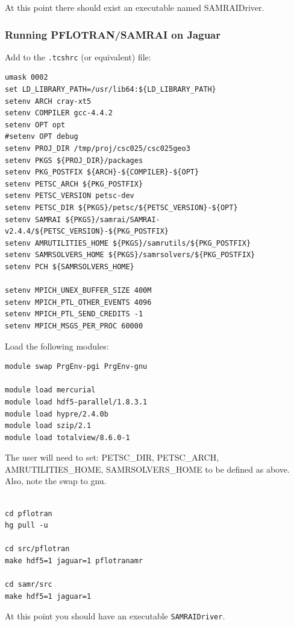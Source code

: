 \documentclass[12pt]{article}
\begin{document}
\noindent
At this point there should exist an executable named SAMRAIDriver.

\subsubsection{Running PFLOTRAN/SAMRAI on Jaguar}

Add to the {\tt .tcshrc} (or equivalent) file:
\begin{verbatim}
umask 0002
set LD_LIBRARY_PATH=/usr/lib64:${LD_LIBRARY_PATH}
setenv ARCH cray-xt5
setenv COMPILER gcc-4.4.2
setenv OPT opt
#setenv OPT debug 
setenv PROJ_DIR /tmp/proj/csc025/csc025geo3
setenv PKGS ${PROJ_DIR}/packages
setenv PKG_POSTFIX ${ARCH}-${COMPILER}-${OPT}
setenv PETSC_ARCH ${PKG_POSTFIX} 
setenv PETSC_VERSION petsc-dev
setenv PETSC_DIR ${PKGS}/petsc/${PETSC_VERSION}-${OPT}
setenv SAMRAI ${PKGS}/samrai/SAMRAI-v2.4.4/${PETSC_VERSION}-${PKG_POSTFIX}
setenv AMRUTILITIES_HOME ${PKGS}/samrutils/${PKG_POSTFIX}
setenv SAMRSOLVERS_HOME ${PKGS}/samrsolvers/${PKG_POSTFIX}
setenv PCH ${SAMRSOLVERS_HOME} 
 
setenv MPICH_UNEX_BUFFER_SIZE 400M
setenv MPICH_PTL_OTHER_EVENTS 4096
setenv MPICH_PTL_SEND_CREDITS -1
setenv MPICH_MSGS_PER_PROC 60000
\end{verbatim}

\noindent
Load the following modules:
\begin{verbatim}
module swap PrgEnv-pgi PrgEnv-gnu
 
module load mercurial
module load hdf5-parallel/1.8.3.1
module load hypre/2.4.0b
module load szip/2.1
module load totalview/8.6.0-1
\end{verbatim}


\noindent
The user will need to set: PETSC\_DIR, PETSC\_ARCH, AMRUTILITIES\_HOME, SAMRSOLVERS\_HOME
to be defined as above. Also, note the swap to gnu.
\begin{verbatim}
 
cd pflotran
hg pull -u

cd src/pflotran
make hdf5=1 jaguar=1 pflotranamr

cd samr/src
make hdf5=1 jaguar=1
\end{verbatim}
At this point you should have an executable \verb|SAMRAIDriver|.
 

 
\end{document}
